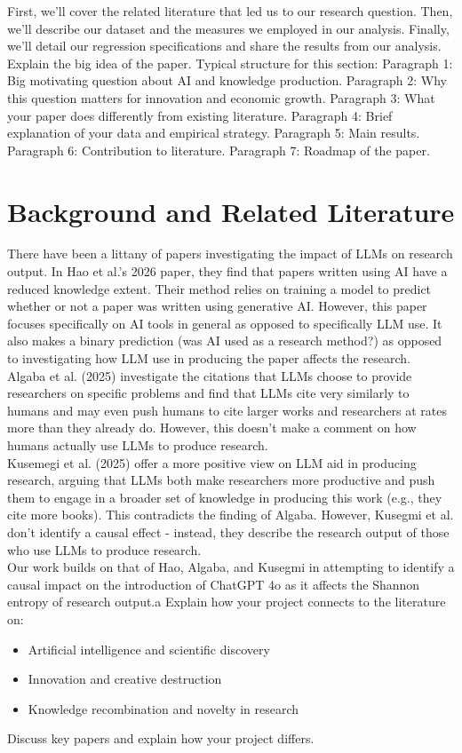 \documentclass[11pt]{article}
\begin{document}
First, we'll cover the related literature that led us to our research question. Then, we'll describe our dataset and the measures we employed in our analysis. Finally, we'll detail our regression specifications and share the results from our analysis.
Explain the big idea of the paper.
Typical structure for this section:
Paragraph 1: Big motivating question about AI and knowledge production.
Paragraph 2: Why this question matters for innovation and economic growth.
Paragraph 3: What your paper does differently from existing literature.
Paragraph 4: Brief explanation of your data and empirical strategy.
Paragraph 5: Main results.
Paragraph 6: Contribution to literature.
Paragraph 7: Roadmap of the paper.
\section{Background and Related Literature}
There have been a littany of papers investigating the impact of LLMs on research output. In Hao et al.'s 2026 paper, they find that papers written using AI have a reduced knowledge extent. Their method relies on training a model to predict whether or not a paper was written using generative AI. However, this paper focuses specifically on AI tools in general as opposed to specifically LLM use. It also makes a binary prediction (was AI used as a research method?) as opposed to investigating how LLM use in producing the paper affects the research.\\
Algaba et al. (2025) investigate the citations that LLMs choose to provide researchers on specific problems and find that LLMs cite very similarly to humans and may even push humans to cite larger works and researchers at rates more than they already do. However, this doesn't make a comment on how humans actually use LLMs to produce research.\\
Kusemegi et al. (2025) offer a more positive view on LLM aid in producing research, arguing that LLMs both make researchers more productive and push them to engage in a broader set of knowledge in producing this work (e.g., they cite more books). This contradicts the finding of Algaba. However, Kusegmi et al. don't identify a causal effect - instead, they describe the research output of those who use LLMs to produce research.\\
Our work builds on that of Hao, Algaba, and Kusegmi in attempting to identify a causal impact on the introduction of ChatGPT 4o as it affects the Shannon entropy of research output.a
Explain how your project connects to the literature on:
\begin{itemize}
\item Artificial intelligence and scientific discovery
\item Innovation and creative destruction
\item Knowledge recombination and novelty in research
\end{itemize}
Discuss key papers and explain how your project differs.
\end{document}
